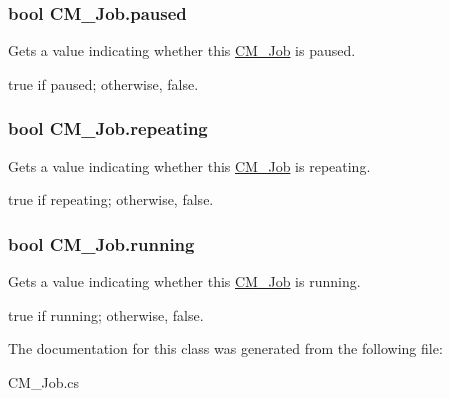\subsubsection[{paused}]{\setlength{\rightskip}{0pt plus 5cm}bool C\+M\+\_\+\+Job.\+paused\hspace{0.3cm}{\ttfamily [get]}}\label{class_c_m___job_a4d7d6001f3d1153d50f83490fe426925}


Gets a value indicating whether this \hyperlink{class_c_m___job}{C\+M\+\_\+\+Job} is paused. 

{\ttfamily true} if paused; otherwise, {\ttfamily false}.\hypertarget{class_c_m___job_ab18400e9cdb983c298d92c6e28acc599}{}
\subsubsection[{repeating}]{\setlength{\rightskip}{0pt plus 5cm}bool C\+M\+\_\+\+Job.\+repeating\hspace{0.3cm}{\ttfamily [get]}}\label{class_c_m___job_ab18400e9cdb983c298d92c6e28acc599}


Gets a value indicating whether this \hyperlink{class_c_m___job}{C\+M\+\_\+\+Job} is repeating. 

{\ttfamily true} if repeating; otherwise, {\ttfamily false}.\hypertarget{class_c_m___job_a2226fbaee0c831d28fde43ffe0a58f70}{}
\subsubsection[{running}]{\setlength{\rightskip}{0pt plus 5cm}bool C\+M\+\_\+\+Job.\+running\hspace{0.3cm}{\ttfamily [get]}}\label{class_c_m___job_a2226fbaee0c831d28fde43ffe0a58f70}


Gets a value indicating whether this \hyperlink{class_c_m___job}{C\+M\+\_\+\+Job} is running. 

{\ttfamily true} if running; otherwise, {\ttfamily false}.

The documentation for this class was generated from the following file\+:\begin{DoxyCompactItemize}
\item 
C\+M\+\_\+\+Job.\+cs\end{DoxyCompactItemize}
